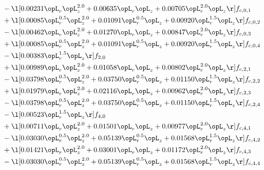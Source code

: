 \begin{alignat}{2}
& - \l[  0.00231 \opL_r \opL_z^{2.0} +  0.00635 \opL_r \opL_z +  0.00705 \opL_r^{2.0} \opL_z  \r] f_{c,0,1} \nonumber \\ 
& + \l[  0.00085 \opL_r^{0.5} \opL_z^{2.0} +  0.01091 \opL_r^{0.5} \opL_z +  0.00920 \opL_r^{1.5} \opL_z  \r] f_{c,0,2} \nonumber \\ 
& - \l[  0.00462 \opL_r \opL_z^{2.0} +  0.01270 \opL_r \opL_z +  0.00847 \opL_r^{2.0} \opL_z  \r] f_{c,0,3} \nonumber \\ 
& + \l[  0.00085 \opL_r^{0.5} \opL_z^{2.0} +  0.01091 \opL_r^{0.5} \opL_z +  0.00920 \opL_r^{1.5} \opL_z  \r] f_{c,0,4} \nonumber \\ 
& - \l[  0.00383 \opL_r^{1.5} \opL_z  \r] f_{2,0} \nonumber \\ 
& + \l[  0.00989 \opL_r \opL_z^{2.0} +  0.01058 \opL_r \opL_z +  0.00802 \opL_r^{2.0} \opL_z  \r] f_{c,2,1} \nonumber \\ 
& - \l[  0.03798 \opL_r^{0.5} \opL_z^{2.0} +  0.03750 \opL_r^{0.5} \opL_z +  0.01150 \opL_r^{1.5} \opL_z  \r] f_{c,2,2} \nonumber \\ 
& + \l[  0.01979 \opL_r \opL_z^{2.0} +  0.02116 \opL_r \opL_z +  0.00962 \opL_r^{2.0} \opL_z  \r] f_{c,2,3} \nonumber \\ 
& - \l[  0.03798 \opL_r^{0.5} \opL_z^{2.0} +  0.03750 \opL_r^{0.5} \opL_z +  0.01150 \opL_r^{1.5} \opL_z  \r] f_{c,2,4} \nonumber \\ 
& - \l[  0.00523 \opL_r^{1.5} \opL_z  \r] f_{4,0} \nonumber \\ 
& + \l[  0.00711 \opL_r \opL_z^{2.0} +  0.01501 \opL_r \opL_z +  0.00977 \opL_r^{2.0} \opL_z  \r] f_{c,4,1} \nonumber \\ 
& - \l[  0.03030 \opL_r^{0.5} \opL_z^{2.0} +  0.05139 \opL_r^{0.5} \opL_z +  0.01568 \opL_r^{1.5} \opL_z  \r] f_{c,4,2} \nonumber \\ 
& + \l[  0.01421 \opL_r \opL_z^{2.0} +  0.03001 \opL_r \opL_z +  0.01172 \opL_r^{2.0} \opL_z  \r] f_{c,4,3} \nonumber \\ 
& - \l[  0.03030 \opL_r^{0.5} \opL_z^{2.0} +  0.05139 \opL_r^{0.5} \opL_z +  0.01568 \opL_r^{1.5} \opL_z  \r] f_{c,4,4} \nonumber \\ 
\end{alignat} 


